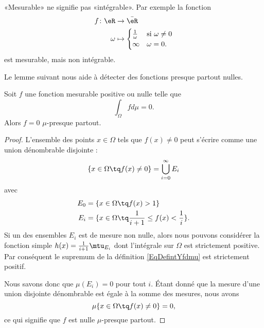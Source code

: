 \begin{remark}
    «Mesurable» ne signifie pas «intégrable». Par exemple la fonction 
    \begin{equation}
        \begin{aligned}
            f\colon \eR&\to \bar\eR \\
            \omega&\mapsto\begin{cases}
            \frac{1}{ \omega }    &   \text{si $ \omega\neq 0$}\\
            \infty    &    \text{$\omega=0$}.
            \end{cases}
        \end{aligned}
    \end{equation}
    est mesurable, mais non intégrable.
\end{remark}

Le lemme suivant nous aide à détecter des fonctions presque partout nulles.
\begin{lemma}   \label{Lemfobnwt}
    Soit \( f\) une fonction mesurable positive ou nulle telle que
    \begin{equation}
        \int_{\Omega}fd\mu=0.
    \end{equation}
    Alors \( f=0\) \( \mu\)-presque partout.
\end{lemma}

\begin{proof}
    L'ensemble des points \( x\in\Omega\) tels que \( f(x)\neq 0\) peut s'écrire comme une union dénombrable disjointe :
    \begin{equation}
        \{ x\in\Omega\tq f(x)\neq 0 \}=\bigcup_{i=0}^{\infty}E_i
    \end{equation}
    avec
    \begin{subequations}
        \begin{align}
            E_0&=\{ x\in\Omega\tq f(x)>1 \}\\
            E_i&=\{ x\in\Omega\tq \frac{1}{ i+1 }\leq f(x)<\frac{1}{ i } \}.
        \end{align}
    \end{subequations}
    Si un des ensembles \( E_i\) est de mesure non nulle, alors nous pouvons considérer la fonction simple \( h(x)=\frac{1}{ i+1 }\mtu_{E_i}\) dont l'intégrale sur \( \Omega\) est strictement positive. Par conséquent le supremum de la définition \eqref{EqDefintYfdmu} est strictement positif.

    Nous savons donc que \( \mu(E_i)=0\) pour tout \( i\). Étant donné que la mesure d'une union disjointe dénombrable est égale à la somme des mesures, nous avons
    \begin{equation}
        \mu\{ x\in\Omega\tq f(x)\neq 0 \}=0,
    \end{equation}
    ce qui signifie que \( f\) est nulle \( \mu\)-presque partout.
\end{proof}

